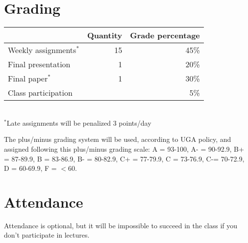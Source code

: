 \documentclass[12pt]{article}
\begin{document}
  

\vspace{-2mm}
\section*{\normalsize Grading}
\vspace{-4mm}
\begin{center}
  \begin{tabular}[h!]{lrr}
    \hline
                           & Quantity & Grade percentage         \\
    \hline
    Weekly assignments$^*$ & 15       & 45\%                     \\
    Final presentation     & 1        & 20\%                     \\
    Final paper$^{*}$      & 1        & 30\%                     \\
    Class participation    &          & 5\%                      \\
    \hline
  \end{tabular}                                                  \\
  \small
\hspace{0mm} $^*$Late assignments will be penalized 3 points/day \\ 
\end{center}
The plus/minus grading system will be used, according to UGA policy,
and assigned following this plus/minus grading scale: A = 93-100, A- =
90-92.9, B+ = 87-89.9, B = 83-86.9, B- = 80-82.9, C+ = 77-79.9, C =
73-76.9, C-= 70-72.9, D = 60-69.9, F = $<$60. 


\vspace{-2mm}
\section*{\normalsize Attendance}
\vspace{-4mm}
Attendance is optional, but it will be impossible to succeed in the
class if you don't participate in lectures. 

\end{document}

